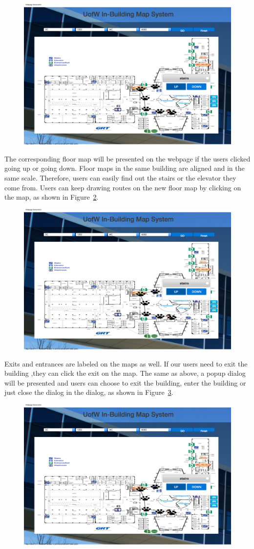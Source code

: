 \documentclass{sigchi}
\begin{document}
\begin{figure}[!h]
\centering
\includegraphics[width=0.6\columnwidth]{pics/map2.png}
\label{fig:map2}
\end{figure}

The corresponding floor map will be presented on the webpage if the users clicked going up or going down. Floor maps in the same building are aligned and in the same scale. Therefore, users can easily find out the stairs or the elevator they come from. Users can keep drawing routes on the new floor map by clicking on the map, as shown in Figure~\ref{fig:map3}.

\begin{figure}[!h]
\centering
\includegraphics[width=0.6\columnwidth]{pics/map3.png}
\label{fig:map3}
\end{figure}

Exits and entrances are labeled on the maps as well. If our users need to exit the building ,they can click the exit on the map. The same as above, a popup dialog will be presented and users can choose to exit the building, enter the building or just close the dialog in the dialog, as shown in Figure~\ref{fig:map4}.


\begin{figure}[!h]
\centering
\includegraphics[width=0.6\columnwidth]{pics/map4.png}
\label{fig:map4}
\end{figure}
\end{document}
